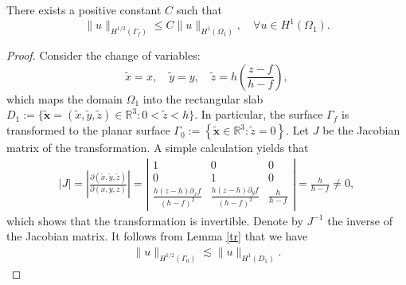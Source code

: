 \documentclass[final,leqno]{siamltex}
\begin{document}
\begin{lemma}\label{trf}
 There exists a positive constant $C$ such that
 \[
  \|u\|_{H^{1/2}(\Gamma_f)}\leq C\|u\|_{H^1(\Omega_1)},\quad\forall u\in
H^1(\Omega_1).
 \]
\end{lemma}

\begin{proof}
Consider the change of variables:
\[
  \tilde x =x, \quad  \tilde y = y, \quad
  \tilde z= h \left(  \frac{z-f}{h-f}\right),
\]
which maps the domain $\Omega_1$ into the rectangular slab $D_1:=
\{\tilde{\boldsymbol x}=(\tilde x, \tilde y, \tilde z ) \in \mathbb R^3: 0<
\tilde z < h\}$. In particular, the surface $\Gamma_f$ is transformed to the
planar surface $\Gamma_0:=\left\{\tilde{\boldsymbol x}\in \mathbb R^3:
\tilde z =0 \right\}$. Let $J$ be the Jacobian matrix of the transformation. A
simple calculation yields that
\begin{align*}
|J|=\left|\frac{\partial(\tilde x, \tilde y, \tilde z) }{\partial (x, y,
z)}\right|=\left|
 \begin{matrix}
  1 & 0 & 0\\
  0 & 1&0\\
  \frac{h(z -h) \partial_x f}{(h -f)^2} &  \frac{h(z -h) \partial_{y} f}{(h
-f)^2} &\frac{h}{h-f}
 \end{matrix}
\right|=\frac{h}{h-f} \neq 0,
\end{align*}
which shows that the transformation is invertible. Denote by $J^{-1}$ the
inverse of the Jacobian matrix. It follows from Lemma \ref{tr} that we have
\begin{align}\label{l1}
 \|u \|_{H^{1/2} (\Gamma_0) } \lesssim \|u \|_{H^1(D_1)}.
\end{align}


\end{proof}
\end{document}
